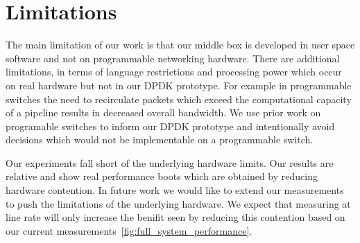 \section{Limitations}

The main limitation of our work is that our middle box is developed in user
space software and not on programmable networking hardware. There are additional
limitations, in terms of language restrictions and processing power which occur
on real hardware but not in our DPDK prototype. For example in programmable
switches the need to recirculate packets which exceed the computational capacity
of a pipeline results in decreased overall bandwidth. We use prior work on
programable switches to inform our DPDK prototype and intentionally avoid
decisions which would not be implementable on a programmable switch.

Our experiments fall short of the underlying hardware limits. Our results are
relative and show real performance boots which are obtained by reducing hardware
contention. In future work we would like to extend our measurements to push the
limitations of the underlying hardware. We expect that measuring at line rate
will only increase the benifit seen by reducing this contention based on our
current measurements~\ref{fig:full_system_performance}.

